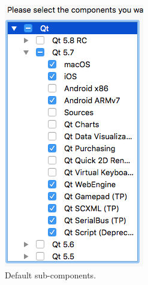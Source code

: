 \begin{figure} [h]
\begin{subfigure}{.333\textwidth}
  \includegraphics[width=.9\textwidth]{graphics/qt-setup-osx-2.png}
  \caption{Default sub-components.}
\end{subfigure}%
\begin{subfigure}{.333\textwidth}
  \centering

\end{subfigure}
\end{figure}
